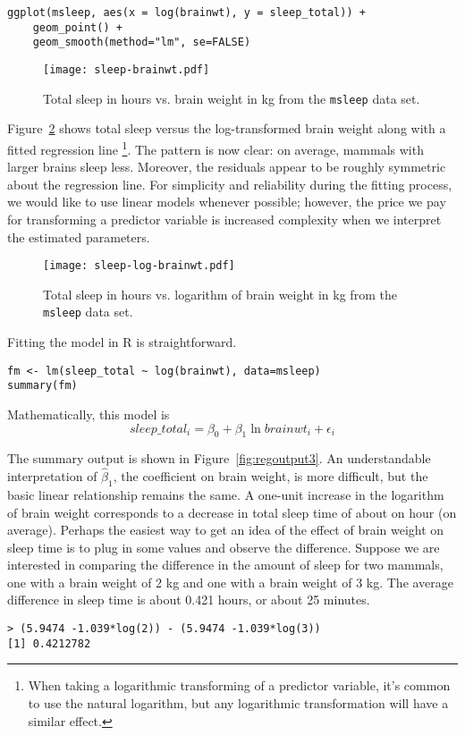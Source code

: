 \begin{Verbatim}[samepage=true]
ggplot(msleep, aes(x = log(brainwt), y = sleep_total)) +
    geom_point() +
    geom_smooth(method="lm", se=FALSE)
\end{Verbatim}

\begin{figure}
\begin{center}
\texttt{[image: sleep-brainwt.pdf]}
\caption{Total sleep in hours vs. brain weight in kg from the \texttt{msleep}
data set.}
\label{fig:sleep-brainwt}
\end{center}
\end{figure}

Figure~\ref{fig:sleep-log-brainwt} shows total sleep versus the
log-transformed brain weight along with a fitted regression line
\footnote{When taking a logarithmic transforming of a predictor
  variable, it's common to use the natural logarithm, but any
  logarithmic transformation will have a similar effect.}. The pattern
is now clear: on average, mammals with larger brains sleep
less. Moreover, the residuals appear to be roughly symmetric about the
regression line. For simplicity and reliability during the fitting
process, we would like to use linear models whenever possible;
however, the price we pay for transforming a predictor variable is
increased complexity when we interpret the estimated parameters.

\begin{figure}
\begin{center}
\texttt{[image: sleep-log-brainwt.pdf]}
\caption{Total sleep in hours vs. logarithm of brain weight in kg from the \texttt{msleep}
data set.}
\label{fig:sleep-log-brainwt}
\end{center}
\end{figure}

Fitting the model in R is straightforward.
\begin{Verbatim}[samepage=true]
fm <- lm(sleep_total ~ log(brainwt), data=msleep)
summary(fm)
\end{Verbatim}
Mathematically, this model is
\begin{equation}
  \label{eq:sleep-log-brainwt}
  sleep\_total_i = \beta_0 + \beta_1 \ln brainwt_i + \epsilon_i
\end{equation}

The summary output is shown in Figure~\ref{fig:regoutput3}.  An
understandable interpretation of $\hat{\beta}_1$, the coefficient on
brain weight, is more difficult, but the basic linear relationship
remains the same. A one-unit increase in the logarithm of brain weight
corresponds to a decrease in total sleep time of about on hour (on
average). Perhaps the easiest way to get an idea of the effect of
brain weight on sleep time is to plug in some values and observe the
difference. Suppose we are interested in comparing the difference in the 
amount of sleep for two mammals, one with a brain weight of 2 kg
and one with a brain weight of 3 kg. The average difference in sleep
time is about 0.421 hours, or about 25 minutes.
\begin{Verbatim}[samepage=true]
> (5.9474 -1.039*log(2)) - (5.9474 -1.039*log(3))
[1] 0.4212782
\end{Verbatim}



